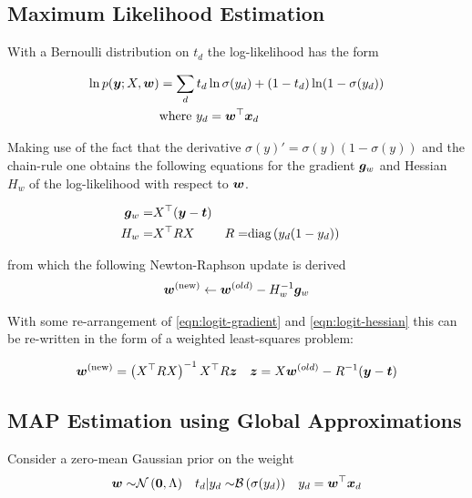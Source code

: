 \subsection*{Maximum Likelihood Estimation}
With a Bernoulli distribution on $t_d$ the log-likelihood has the form

\begin{equation}
\begin{aligned}
\ln p(\bm y; X, \bm w) & = \sum_d t_d \ln \sigma(y_d) + (1 - t_d) \ln (1 - \sigma(y_d)) \\
& \text{where } y_d = \bm w^\top\bm x_d
\end{aligned}
\end{equation}

Making use of the fact that the derivative $\sigma(y)' = \sigma(y)(1 - \sigma(y))$ and the chain-rule one obtains the following equations for the gradient $\bm g_w$ and Hessian $H_w$ of the log-likelihood with respect to $\bm w$.

\begin{align}
\bm g_w = & X^\top (\bm y - \bm t) \label{eqn:logit-gradient}\\
H_w      = & X^\top R X & R = & \text{diag} \left( {y_d (1 - y_d)} \right) \label{eqn:logit-hessian}
\end{align}

from which the following Newton-Raphson update is derived
\begin{align}
\bm w^{(\text{new})} \leftarrow \bm w^{(old)} - H_w^{-1} \bm g_w
\end{align}

With some re-arrangement of \eqref{eqn:logit-gradient} and \eqref{eqn:logit-hessian} this can be re-written in the form of a weighted least-squares problem:

\begin{align}
\bm w^{(\text{new})} & = \left(X^\top R X \right)^{-1} X^\top R \bm z & \bm z = X \bm w^{(old)}-R^{-1}(\bm y - \bm t)
\end{align}


\subsection*{MAP Estimation using Global Approximations}
\newcommand \wmap[0] { \vv{w}_{\text{\tiny \sc MAP}} }

Consider a zero-mean Gaussian prior on the weight
\begin{align}\bm w \sim & \mathcal{N} \left( {\bm 0}, {\Lambda} \right) &
t_d | y_d \sim & \mathcal{B}\left( \sigma(y_d) \right) & 
y_d = \bm w^\top\bm x_d  \label{eqn:bayes-logit-model}
\end{align}

